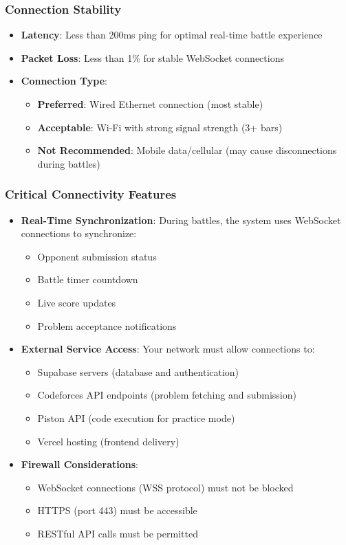 \documentclass[12pt,a4paper]{article}
\begin{document}
\subsubsection{Connection Stability}

\begin{itemize}[leftmargin=*]
\item \textbf{Latency}: Less than 200ms ping for optimal real-time battle experience
\item \textbf{Packet Loss}: Less than 1\% for stable WebSocket connections
\item \textbf{Connection Type}: 
  \begin{itemize}
    \item \textbf{Preferred}: Wired Ethernet connection (most stable)
    \item \textbf{Acceptable}: Wi-Fi with strong signal strength (3+ bars)
    \item \textbf{Not Recommended}: Mobile data/cellular (may cause disconnections during battles)
  \end{itemize}
\end{itemize}

\subsubsection{Critical Connectivity Features}

\begin{itemize}[leftmargin=*]
\item \textbf{Real-Time Synchronization}: During battles, the system uses WebSocket connections to synchronize:
  \begin{itemize}
    \item Opponent submission status
    \item Battle timer countdown
    \item Live score updates
    \item Problem acceptance notifications
  \end{itemize}
\item \textbf{External Service Access}: Your network must allow connections to:
  \begin{itemize}
    \item Supabase servers (database and authentication)
    \item Codeforces API endpoints (problem fetching and submission)
    \item Piston API (code execution for practice mode)
    \item Vercel hosting (frontend delivery)
  \end{itemize}
\item \textbf{Firewall Considerations}:
  \begin{itemize}
    \item WebSocket connections (WSS protocol) must not be blocked
    \item HTTPS (port 443) must be accessible
    \item RESTful API calls must be permitted
  \end{itemize}
\end{itemize}
\end{document}
